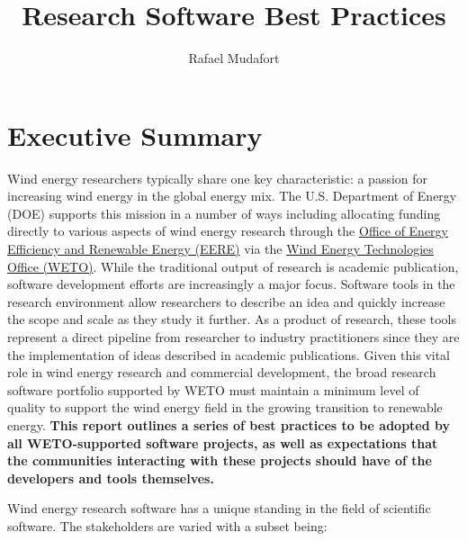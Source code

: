 \documentclass[]{nrel}
\title{Research Software Best Practices}
\author{Rafael Mudafort} %
\affil{National Renewable Energy Laboratory}
\begin{document}
\frontmatter


\chapter{Executive Summary}

Wind energy researchers typically share one key characteristic: a passion for increasing
wind energy in the global energy mix. The U.S. Department of Energy (DOE) supports this mission
in a number of ways including allocating funding directly to various aspects of wind energy
research through the
\href{https://www.energy.gov/eere/office-energy-efficiency-renewable-energy}{Office of Energy Efficiency and Renewable Energy (EERE)}
via the
\href{https://www.energy.gov/eere/wind/wind-energy-technologies-office}{Wind Energy Technologies Office (WETO)}.
While the traditional output of research is academic publication, software development efforts
are increasingly a major focus. Software tools in the research environment allow researchers to
describe an idea and quickly increase the scope and scale as they study it further.
As a product of research, these tools represent a direct pipeline from researcher to industry
practitioners since they are the implementation of ideas described in academic publications.
Given this vital role in wind energy research and
commercial development, the broad research software portfolio supported by WETO must maintain a
minimum level of quality to support the wind energy field in the growing transition to
renewable energy. \textbf{This report outlines a series of best practices to be adopted by all
WETO-supported software projects, as well as expectations that the communities interacting with
these projects should have of the developers and tools themselves.}

Wind energy research software has a unique standing in the field of scientific software. The
stakeholders are varied with a subset being:
\end{document}
